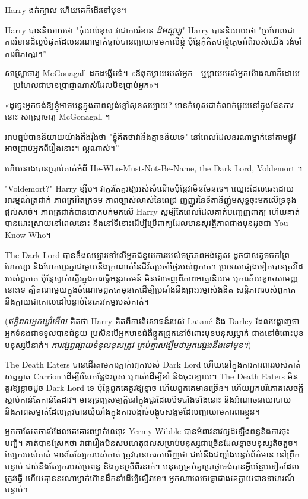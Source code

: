Harry ងក់ក្បាល ហើយគេក៏ដើរទៅមុខ។

Harry បាននិយាយថា "កុំយល់ខុស វាជាការរំខាន \emph{ដ៏អស្ចារ្យ}" Harry បាននិយាយថា "ប្រហែលជាការរំខានដ៏ល្អបំផុតដែលនរណាម្នាក់ធ្លាប់បានព្យាយាមមកលើខ្ញុំ ប៉ុន្តែកុំគិតថាខ្ញុំភ្លេចអំពីរបស់យើង រង់ចាំការពិភាក្សា។”

សាស្រ្តាចារ្យ McGonagall ដកដង្ហើមធំ។ «ឪពុកម្ដាយ​របស់​អ្នក—ឬ​ម្ដាយ​របស់​អ្នក​យ៉ាង​ណា​ក៏​ដោយ—ប្រហែល​ជា​មាន​ប្រាជ្ញា​ណាស់​ដែល​មិន​ប្រាប់​អ្នក​»។

«ដូច្នេះ​អ្នក​ចង់​ឱ្យ​ខ្ញុំ​អាច​បន្ត​ក្នុង​ភាព​ល្ងង់​ខ្លៅ​សុខ​សប្បាយ? មានកំហុសជាក់លាក់មួយនៅក្នុងផែនការនោះ សាស្រ្តាចារ្យ McGonagall ។

អាបធ្មប់បាននិយាយយ៉ាងតឹងរ៉ឹងថា "ខ្ញុំគិតថាវានឹងគ្មានន័យទេ" នៅពេលដែលនរណាម្នាក់នៅតាមផ្លូវអាចប្រាប់អ្នកពីរឿងនោះ។ ល្អណាស់។”

ហើយនាងបានប្រាប់គាត់អំពី He-Who-Must-Not-Be-Name, the Dark Lord, Voldemort ។

"Voldemort?" Harry ខ្សឹប។ វាគួរតែគួរឱ្យអស់សំណើចប៉ុន្តែវាមិនមែនទេ។ ឈ្មោះដែលឆេះដោយអារម្មណ៍ត្រជាក់ ភាពក្រអឺតក្រទម ភាពច្បាស់លាស់នៃពេជ្រ ញញួរនៃទីតានីញ៉ូមសុទ្ធចុះមកលើទ្រនុងផ្តល់សាច់។ ភាពត្រជាក់បានបោកបក់មកលើ Harry សូម្បីតែពេលដែលគាត់បញ្ចេញពាក្យ ហើយគាត់បានដោះស្រាយនៅពេលនោះ និងនៅទីនោះដើម្បីប្រើពាក្យដែលមានសុវត្ថិភាពជាងមុនដូចជា You-Know-Who។

The Dark Lord បានខឹងសម្បារទៅលើអ្នកជំនួយការរបស់ចក្រភពអង់គ្លេស ដូចជាសត្វចចកព្រៃ ហែកហួរ និងហែកហួរគ្នាជាមួយនឹងក្រណាត់នៃជីវិតប្រចាំថ្ងៃរបស់ពួកគេ។ ប្រទេសផ្សេងទៀតបានគ្រវីដៃរបស់ពួកគេ ប៉ុន្តែស្ទាក់ស្ទើរក្នុងការធ្វើអន្តរាគមន៍ មិនថាចេញពីភាពអាត្មានិយម ឬការភ័យខ្លាចសាមញ្ញនោះទេ ត្បិតណាមួយក្នុងចំណោមពួកគេមុនគេដើម្បីប្រឆាំងនឹងព្រះអម្ចាស់ងងឹត សន្តិភាពរបស់ពួកគេនឹងក្លាយជាគោលដៅបន្ទាប់នៃភេរវកម្មរបស់គាត់។

(\emph{ឥទ្ធិពលអ្នកឃ្លាំមើល} គិតថា Harry គិតពីការពិសោធន៍របស់ Latané និង Darley ដែលបង្ហាញថាអ្នកទំនងជាទទួលបានជំនួយ ប្រសិនបើអ្នកមានជំងឺឆ្កួតជ្រូកនៅចំពោះមុខមនុស្សម្នាក់ ជាងនៅចំពោះមុខមនុស្សបីនាក់។ \emph {ការផ្សព្វផ្សាយទំនួលខុសត្រូវ គ្រប់គ្នាសង្ឃឹមថាអ្នកផ្សេងនឹងទៅមុន។})

The Death Eaters បានដើរតាមការភ្ញាក់រឭករបស់ Dark Lord ហើយនៅក្នុងការការពាររបស់គាត់ សត្វត្មាត Carrion ដើម្បីរើសកន្លែងរបួស ឬពស់ដើម្បីខាំ និងចុះខ្សោយ។ The Death Eaters មិនគួរឱ្យខ្លាចដូច Dark Lord ទេ ប៉ុន្តែពួកគេគួរឱ្យខ្លាច ហើយពួកគេមានច្រើន។ ហើយ​អ្នក​បរិភោគ​សេចក្ដី​ស្លាប់​កាន់​តែ​កាន់​តែ​ដាវ។ មានទ្រព្យសម្បត្តិនៅក្នុងជួរដែលបិទបាំងទាំងនោះ និងអំណាចនយោបាយ និងភាពសម្ងាត់ដែលត្រូវបានឃុំឃាំងក្នុងការបង្កាច់បង្ខូចសង្គមដែលព្យាយាមការពារខ្លួន។

អ្នក​កាសែត​ចាស់​ដែល​គេ​គោរព​ម្នាក់​ឈ្មោះ Yermy Wibble បាន​អំពាវនាវ​ឲ្យ​ដំឡើង​ពន្ធ​និង​ការ​ចុះ​បញ្ជី។ គាត់​បាន​ស្រែក​ថា វា​ជា​រឿង​មិន​សម​ហេតុ​ផល​សម្រាប់​មនុស្ស​ជា​ច្រើន​ដែល​ខ្លាច​មនុស្ស​តិច​តួច។ ស្បែករបស់គាត់ មានតែស្បែករបស់គាត់ ត្រូវបានគេរកឃើញថា ជាប់នឹងជញ្ជាំងបន្ទប់ព័ត៌មាន នៅព្រឹកបន្ទាប់ ជាប់នឹងស្បែករបស់ប្រពន្ធ និងកូនស្រីពីរនាក់។ មនុស្សគ្រប់គ្នាប្រាថ្នាចង់បានអ្វីបន្ថែមទៀតដែលត្រូវធ្វើ ហើយគ្មាននរណាម្នាក់ហ៊ានដឹកនាំដើម្បីស្នើវាទេ។ អ្នកណាលេចធ្លោជាងគេក្លាយជាឧទាហរណ៍បន្ទាប់។

